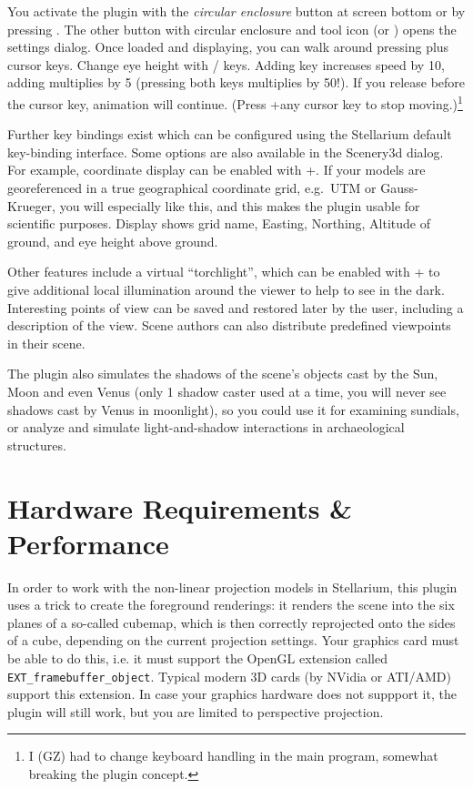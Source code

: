 You activate the plugin with the \emph{circular enclosure} button at screen
bottom or by pressing . The other button with circular enclosure and
tool icon (or ) opens the settings dialog. Once loaded and
displaying, you can walk around pressing \key{\ctrl} plus cursor keys. Change eye
height with / keys. Adding \key{\shift} key increases speed by 10,
adding \key{\Alt} multiplies by 5 (pressing both keys multiplies by 50!). If you release \key{\ctrl} before
the cursor key, animation will continue. (Press \key{\ctrl}+any cursor key to stop
moving.)\footnote{I (GZ) had to change keyboard handling in the
main program, somewhat breaking the plugin concept.}

Further key bindings exist which can be configured using the Stellarium default
key-binding interface. Some options are also available in the Scenery3d dialog.
For example, coordinate display can be enabled with +. If your models are georeferenced
in a true geographical coordinate grid, e.g.\ UTM or Gauss-Krueger, you will
especially like this, and this makes the plugin usable for scientific purposes.
Display shows grid name, Easting, Northing, Altitude of ground, and eye height
above ground.

Other features include a virtual ``torchlight'', which can be enabled with + to give
additional local illumination around the viewer to help to see in the dark.
Interesting points of view can be saved and restored later by the user,
including a description of the view. Scene authors can also distribute
predefined viewpoints in their scene.

The plugin also simulates the shadows of the scene's objects cast by
the Sun, Moon and even Venus (only 1 shadow caster used at a time, you
will never see shadows cast by Venus in moonlight), so you could use
it for examining sundials, or analyze and simulate light-and-shadow
interactions in archaeological structures.

\section{Hardware Requirements \& Performance}
\label{sec:scenery3d:HardwareRequirements}

In order to work with the non-linear projection models in Stellarium,
this plugin uses a trick to create the foreground renderings: it
renders the scene into the six planes of a so-called cubemap, which is
then correctly reprojected onto the sides of a cube, depending on the
current projection settings. Your graphics card must be able to do
this, i.e. it must support the OpenGL extension called
\texttt{EXT\_framebuffer\_object}. Typical modern 3D cards (by NVidia
or ATI/AMD) support this extension. In case your graphics hardware
does not suppport it, the plugin will still work, but you are limited
to perspective projection.

